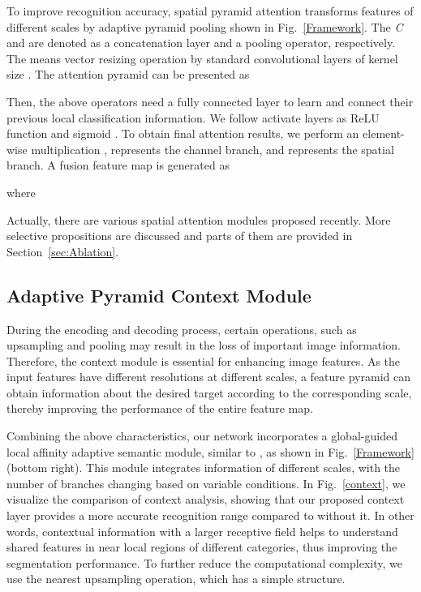 \documentclass[journal,twoside,web]{ieeecolor}
\begin{document}
To improve recognition accuracy, spatial pyramid attention transforms features of different scales by adaptive pyramid pooling shown in Fig.~\ref{Framework}. The \textit{C} and  are denoted as a concatenation layer and a pooling operator, respectively. The  means vector resizing operation by standard convolutional layers of kernel size . The attention pyramid can be presented as

 
Then, the above operators need a fully connected layer  to learn and connect their previous local classification information. We follow activate layers as ReLU function  and sigmoid . To obtain final attention results, we perform an element-wise multiplication ,  represents the channel branch, and  represents the spatial branch. A fusion feature map is generated as

where 



Actually, there are various spatial attention modules proposed recently. More selective propositions are discussed and parts of them are provided in Section~\ref{sec:Ablation}.

\subsection{Adaptive Pyramid Context  Module}
During the encoding and decoding process, certain operations, such as upsampling and pooling may result in the loss of important image information. Therefore, the context module is essential for enhancing image features. As the input features have different resolutions at different scales, a feature pyramid can obtain information about the desired target according to the corresponding scale, thereby improving the performance of the entire feature map.

Combining the above characteristics, our network incorporates a global-guided local affinity adaptive semantic module, similar to \cite{APCNet}, as shown in Fig.~\ref{Framework} (bottom right). This module integrates information of different scales, with the number of branches changing based on variable conditions. In Fig.~\ref{context}, we visualize the comparison of context analysis,  showing that our proposed context layer provides a more accurate recognition range compared to without it. In other words, contextual information with a larger receptive field helps to understand shared features in near local regions of different categories, thus improving the segmentation performance. To further reduce the computational complexity, we use the nearest upsampling operation, which has a simple structure.  
\end{document}

